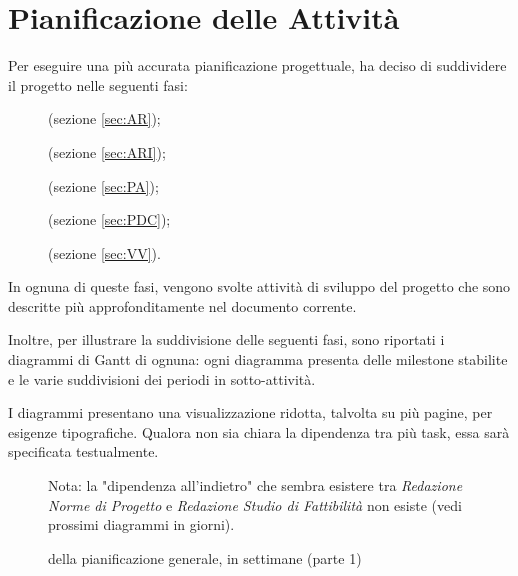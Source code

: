
\section{Pianificazione delle Attività} \label{sec:pianificazione}
Per eseguire una più accurata pianificazione progettuale, \hx{} ha deciso di suddividere il progetto nelle seguenti fasi:
\begin{description}
	\item[\AR] (sezione \ref{sec:AR});
	\item[\ARI] (sezione \ref{sec:ARI});
	\item[\PA] (sezione \ref{sec:PA});
	\item[\PDC] (sezione \ref{sec:PDC});
	\item[\VV] (sezione \ref{sec:VV}).
\end{description}

In ognuna di queste fasi, vengono svolte attività di sviluppo del progetto che sono descritte più approfonditamente nel documento corrente.

Inoltre, per illustrare la suddivisione delle seguenti fasi, sono riportati i diagrammi di Gantt di ognuna: ogni diagramma presenta delle milestone stabilite e le varie suddivisioni dei periodi in sotto-attività.

I diagrammi presentano una visualizzazione ridotta, talvolta su più pagine, per esigenze tipografiche. Qualora non sia chiara la dipendenza tra più task, essa sarà specificata testualmente.

\begin{figure}[H]
\label{tab:genweeks}
\caption{ della pianificazione generale, in settimane (parte 1)}

Nota: la "dipendenza all'indietro" che sembra esistere tra \emph{Redazione Norme di Progetto} e \emph{Redazione Studio di Fattibilità} non esiste (vedi prossimi diagrammi in giorni).
\end{figure}


